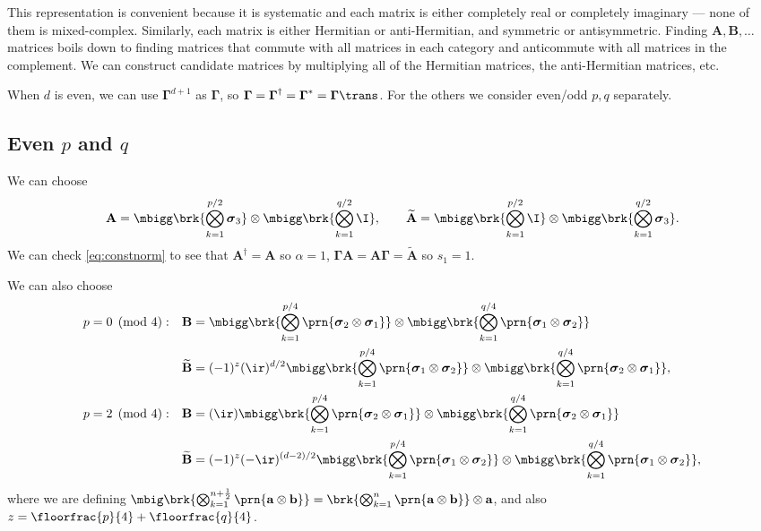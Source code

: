 \documentclass[11pt]{article}
\newcommand{\Gammab}{\boldsymbol{\Gamma}}
\newcommand{\A}{\mathbf{A}}
\newcommand{\B}{\mathbf{B}}
\newcommand{\At}{\widetilde{\mathbf{A}}}
\newcommand{\Bt}{\widetilde{\mathbf{B}}}
\newcommand{\sigmab}{\boldsymbol{\sigma}}
\begin{document}
This representation is convenient because it is systematic and each matrix is either completely real or completely imaginary --- none of them is mixed-complex.
Similarly, each matrix is either Hermitian or anti-Hermitian, and symmetric or antisymmetric.
Finding $\A, \B, \dots$ matrices boils down to finding matrices that commute with all matrices in each category and anticommute with all matrices in the complement.
We can construct candidate matrices by multiplying all of the Hermitian matrices, the anti-Hermitian matrices, etc.

When $d$ is even, we can use $\Gammab^{d+1}$ as $\Gammab$, so $\Gammab = \Gammab^\dag = \Gammab^\ast =\Gammab\trans$.
For the others we consider even/odd $p,q$ separately.


\subsection{Even \texorpdfstring{$p$ and $q$}{p and q}}\label{sec:eveneven}

We can choose
%
\begin{equation*}
  \A = \mbigg\brk{\bigotimes_{k=1}^{p/2} \sigmab_3}
        \otimes \mbigg\brk{\bigotimes_{k=1}^{q/2} \I},
  \qquad
  \At = \mbigg\brk{\bigotimes_{k=1}^{p/2} \I}
        \otimes \mbigg\brk{\bigotimes_{k=1}^{q/2} \sigmab_3}.
\end{equation*}
%
We can check \cref{eq:constnorm} to see that $\A^\dag = \A$ so $\alpha=1$, $\Gammab \A = \A \Gammab = \At$ so $s_1 = 1$.

We can also choose
%
\begin{equation*}
\begin{aligned}
  p &= 0 \pmod 4: &
  \B &= \mbigg\brk{\bigotimes_{k=1}^{p/4} \prn{\sigmab_2 \otimes \sigmab_1}} \otimes
        \mbigg\brk{\bigotimes_{k=1}^{q/4} \prn{\sigmab_1 \otimes \sigmab_2}} \\ &&
  \Bt &= (-1)^{z} (\ir)^{d/2}
        \mbigg\brk{\bigotimes_{k=1}^{p/4} \prn{\sigmab_1 \otimes \sigmab_2}} \otimes
        \mbigg\brk{\bigotimes_{k=1}^{q/4} \prn{\sigmab_2 \otimes \sigmab_1}},
  \\
  p &= 2 \pmod 4: &
  \B &= (\ir)
        \mbigg\brk{\bigotimes_{k=1}^{p/4} \prn{\sigmab_2 \otimes \sigmab_1}} \otimes
        \mbigg\brk{\bigotimes_{k=1}^{q/4} \prn{\sigmab_2 \otimes \sigmab_1}} \\ &&
  \Bt &= (-1)^{z} (-\ir)^{(d-2)/2}
        \mbigg\brk{\bigotimes_{k=1}^{p/4} \prn{\sigmab_1 \otimes \sigmab_2}} \otimes
        \mbigg\brk{\bigotimes_{k=1}^{q/4} \prn{\sigmab_1 \otimes \sigmab_2}},
\end{aligned}
\end{equation*}
%
where we are defining \( \mbig\brk{\bigotimes_{k=1}^{n+\frac{1}{2}} \prn{\mathbf{a} \otimes \mathbf{b}}}
= \brk{\bigotimes_{k=1}^{n} \prn{\mathbf{a} \otimes \mathbf{b}}} \otimes \mathbf{a} \),
and also $z = \floorfrac{p}{4} + \floorfrac{q}{4}$.
\end{document}
